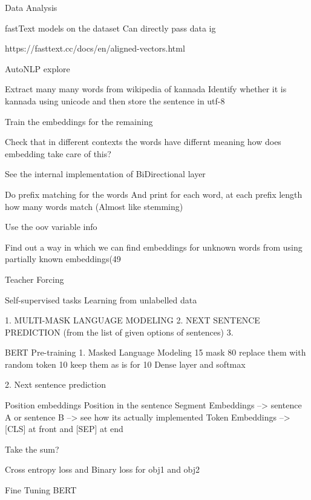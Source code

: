 Data Analysis 
	

fastText models on the dataset
	Can directly pass data ig

	https://fasttext.cc/docs/en/aligned-vectors.html



AutoNLP
	explore

Extract many many words from wikipedia of kannada
	Identify whether it is kannada using unicode and then store the sentence in utf-8

Train the embeddings for the remaining %

Check that in different contexts the words have differnt meaning
	how does embedding take care of this?

See the internal implementation of BiDirectional layer

Do prefix matching for the words
	And print for each word, at each prefix length how many words match
	(Almost like stemming)

	Use the oov variable info
	
Find out a way in which we can find embeddings for unknown words from using partially known embeddings(49%

Teacher Forcing

Self-supervised tasks
	Learning from unlabelled data

	1. MULTI-MASK LANGUAGE MODELING
	2. NEXT SENTENCE PREDICTION (from the list of given options of sentences)
	3. 

BERT
	Pre-training
		1. Masked Language Modeling
			15%
				mask 80%
				replace them with random token 10%
				keep them as is for 10%
			Dense layer and softmax

		2. Next sentence prediction
	
	Position embeddings
		Position in the sentence
		Segment Embeddings --> sentence A or sentence B --> see how its actually implemented
		Token Embeddings --> [CLS] at front and [SEP] at end

		Take the sum? 
	
	Cross entropy loss and Binary loss for obj1 and obj2

	Fine Tuning BERT

